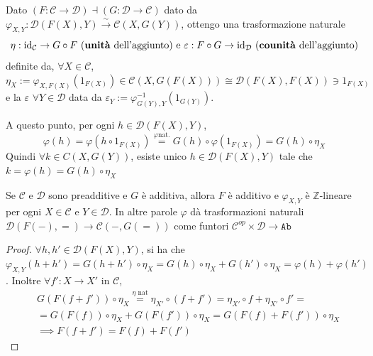 \begin{remark}{}
    Dato \({(F : \mathcal{C} \to \mathcal{D})} \dashv {(G : \mathcal{D} \to
    \mathcal{C})}\) dato da \(\varphi_{X, Y} : \mathcal{D}{(F{(X)}, Y)}
    \overset{\sim }{\to }\mathcal{C}{(X, G{(Y)})}\), ottengo una trasformazione
    naturale
    \[
      \eta : \mathrm{id}_\mathcal{C} \to G \circ F \text{ (\textbf{unità} dell'aggiunto)
      e } \varepsilon : F \circ G \to \mathrm{id}_\mathcal{D} \text{
          (\textbf{counità} dell'aggiunto)}
    \]
    definite da, \(\forall X \in \mathcal{C}\), \(\eta_X := \varphi _{X, F{(X)}}
    {(1_{F{(X)}} )} \in \mathcal{C}{(X, G{(F{(X)})})} \cong \mathcal{D}{(F{(X)},
    F{(X)})}\ni 1_{F{(X)}} \) e la \(\varepsilon\) \(\forall Y \in \mathcal{D}\) data da 
    \(\varepsilon_Y := \varphi ^{-1}_{G{(Y)}, Y} {(1_{G{(Y)}} )}\).

    A questo punto, per ogni \(h \in \mathcal{D}{(F{(X)}, Y)}\), 
    \[
      \varphi {(h)} = \varphi {(h \circ 1_{F{(X)}} )} \overset{\varphi  \text{
      nat.}}{=} G{(h)} \circ \varphi{(1_{F{(X)}} )} = G{(h)} \circ \eta_X
    \]
    Quindi \(\forall k \in C{(X, G{(Y)})}\), esiste unico \(h \in
    \mathcal{D}{(F{(X)} , Y)}\) tale che \(k = \varphi {(h)} = G{(h)} \circ
    \eta_{X} \)  
\end{remark}

\begin{proposition}{}
    Se \(\mathcal{C}\) e \(\mathcal{D}\) sono preadditive e \(G\) è additiva,
    allora \(F\) è additivo e \(\varphi _{X, Y} \) è \(\mathbb{Z}\)-lineare per
    ogni \(X \in \mathcal{C}\) e \(Y \in \mathcal{D}\). In altre parole
    \(\varphi \) dà trasformazioni naturali \(\mathcal{D}{(F{(-)}, =)} \to
    \mathcal{C}{(-, G{(=)})}\) come funtori \(\mathcal{C}^{op} \times
    \mathcal{D} \to \mathtt{Ab}\) 
\end{proposition}

\begin{proof}{}
    \(\forall h, h' \in \mathcal{D}{(F{(X)}, Y)}\), si ha che \(\varphi_{X, Y}  {(h +
    h')} = G{(h + h')} \circ \eta_X = G{(h )} \circ \eta_X + G{(h')} \circ
    \eta_X = \varphi {(h)} + \varphi {(h')}\). Inoltre \(\forall f' : X \to X'\)
    in \(\mathcal{C}\), 
    \begin{align*}
      &G{(F{(f+f')})} \circ \eta_X \overset{\eta \text{ nat}}{=} \eta_{X'} \circ
        {(f + f')} = \eta_{X'} \circ f + \eta_{X'} \circ f' = \\
      &= G{(F{(f)})} \circ \eta_X + G{(F{(f')})} \circ \eta_{X} = G{(F{(f)} +
    F{(f')})} \circ \eta_X \\ &\implies F{(f + f')} = F{(f)} + F{(f')}
    \end{align*}
\end{proof} %

